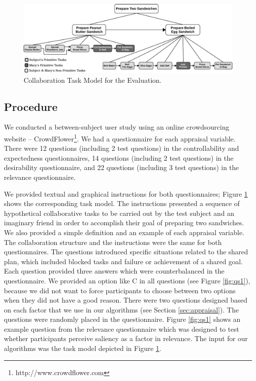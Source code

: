 \documentclass[12pt]{report}
\begin{document}
\begin{figure}[tbh]
  \centering
  \includegraphics[width=1\textwidth]{figure/taskModel-croped.pdf}
  \caption{Collaboration Task Model for the Evaluation.}
  \label{fig:taskModel}
  \vspace*{-5mm}
\end{figure}

\subsection{Procedure}
 We conducted a between-subject user study using an online crowdsourcing website
 -- CrowdFlower\footnote{http://www.crowdflower.com}. We had a questionnaire for
 each appraisal variable. There were 12 questions (including 2 test questions)
 in the controllability and expectedness questionnaires, 14 questions (including
 2 test questions) in the desirability questionnaire, and 22 questions
 (including 3 test questions) in the relevance questionnaire.
 
We provided textual and graphical instructions for both questionnaires; Figure
\ref{fig:taskModel} shows the corresponding task model. The instructions
presented a sequence of hypothetical collaborative tasks to be carried out by
the test subject and an imaginary friend in order to accomplish their
goal of preparing two sandwiches. We also provided a simple definition and an
example of each appraisal variable. The collaboration structure and the
instructions were the same for both questionnaires. The questions introduced
specific situations related to the shared plan, which included blocked tasks and
failure or achievement of a shared goal. Each question provided three answers
which were counterbalanced in the questionnaire. We provided an option like C in
all questions (see Figure \ref{fig:qs1}), because we did not want to force
participants to choose between two options when they did not have a good reason.
There were two questions designed based on each factor that we use in our
algorithms (see Section \ref{sec:appraisal}). The questions were randomly placed
in the questionnaire. Figure \ref{fig:qs1} shows an example question from the
relevance questionnaire which was designed to test whether participants perceive
saliency as a factor in relevance. The input for our algorithms was the task
model depicted in Figure \ref{fig:taskModel}.
\end{document}
